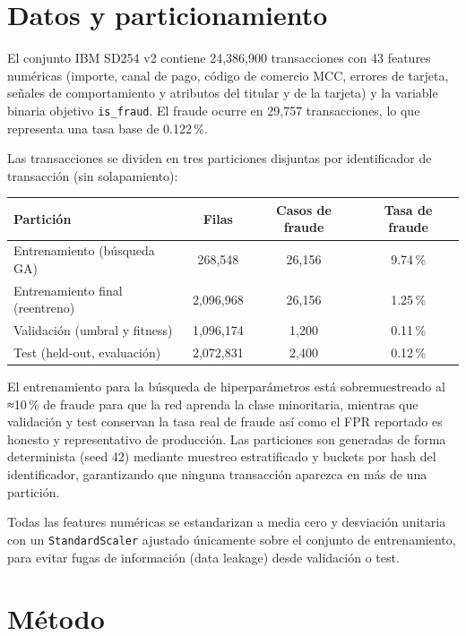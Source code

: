 \documentclass[11pt,a4paper]{article}
\begin{document}
\section{Datos y particionamiento}
El conjunto IBM SD254 v2 contiene 24,386,900 transacciones con 43 features numéricas (importe, canal de pago, código de comercio MCC, errores de tarjeta, señales de comportamiento y atributos del titular y de la tarjeta) y la variable binaria objetivo \texttt{is\_fraud}. El fraude ocurre en 29,757 transacciones, lo que representa una tasa base de 0.122\,\%.

Las transacciones se dividen en tres particiones disjuntas por identificador de transacción (sin solapamiento):

\begin{center}
\begin{tabular}{lccc}
\toprule
Partición & Filas & Casos de fraude & Tasa de fraude \\
\midrule
Entrenamiento (búsqueda GA) & 268,548 & 26,156 & 9.74\,\% \\
Entrenamiento final (reentreno) & 2,096,968 & 26,156 & 1.25\,\% \\
Validación (umbral y fitness) & 1,096,174 & 1,200 & 0.11\,\% \\
Test (held-out, evaluación) & 2,072,831 & 2,400 & 0.12\,\% \\
\bottomrule
\end{tabular}
\end{center}

El entrenamiento para la búsqueda de hiperparámetros está sobremuestreado al ≈10\,\% de fraude para que la red aprenda la clase minoritaria, mientras que validación y test conservan la tasa real de fraude así como el FPR reportado es honesto y representativo de producción. Las particiones son generadas de forma determinista (seed 42) mediante muestreo estratificado y buckets por hash del identificador, garantizando que ninguna transacción aparezca en más de una partición.

Todas las features numéricas se estandarizan a media cero y desviación unitaria con un \texttt{StandardScaler} ajustado únicamente sobre el conjunto de entrenamiento, para evitar fugas de información (data leakage) desde validación o test.

\section{Método}
\end{document}
